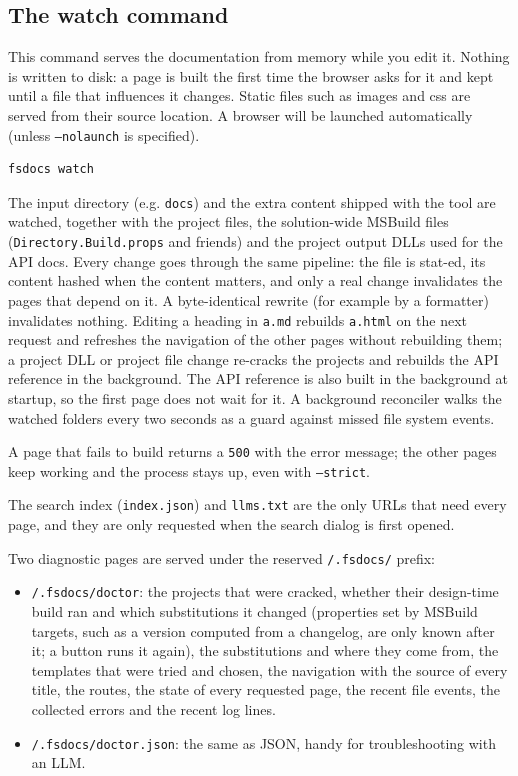 \documentclass{article}
\begin{document}
\subsection*{The watch command}



This command serves the documentation from memory while you edit it. Nothing is written to disk: a page is
built the first time the browser asks for it and kept until a file that influences it changes. Static files
such as images and css are served from their source location. A browser will be launched automatically
(unless \texttt{--nolaunch} is specified).
\begin{lstlisting}
fsdocs watch

\end{lstlisting}


The input directory (e.g. \texttt{docs}) and the extra content shipped with the tool are watched, together with the
project files, the solution-wide MSBuild files (\texttt{Directory.Build.props} and friends) and the project output
DLLs used for the API docs. Every change goes through the same pipeline: the file is
stat-ed, its content hashed when the content matters, and only a real change invalidates the pages that
depend on it. A byte-identical rewrite (for example by a formatter) invalidates nothing. Editing a heading in
\texttt{a.md} rebuilds \texttt{a.html} on the next request and refreshes the navigation of the other pages without
rebuilding them; a project DLL or project file change re-cracks the projects and rebuilds the API reference in the
background. The API reference is also built in the background at startup, so the first page does not wait
for it. A background reconciler walks the watched folders every two seconds as a guard against missed file system events.


A page that fails to build returns a \texttt{500} with the error message; the other pages keep working and the
process stays up, even with \texttt{--strict}.


The search index (\texttt{index.json}) and \texttt{llms.txt} are the only URLs that need every page, and they are only
requested when the search dialog is first opened.


Two diagnostic pages are served under the reserved \texttt{/.fsdocs/} prefix:
\begin{itemize}
\item \texttt{/.fsdocs/doctor}: the projects that were cracked, whether their design-time build ran and which
substitutions it changed (properties set by MSBuild targets, such as a version computed from a
changelog, are only known after it; a button runs it again), the substitutions and where they come
from, the templates that were tried and chosen, the navigation with the source of every title, the
routes, the state of every requested page, the recent file events, the collected errors and the
recent log lines.

\item \texttt{/.fsdocs/doctor.json}: the same as JSON, handy for troubleshooting with an LLM.

\end{itemize}
\end{document}
